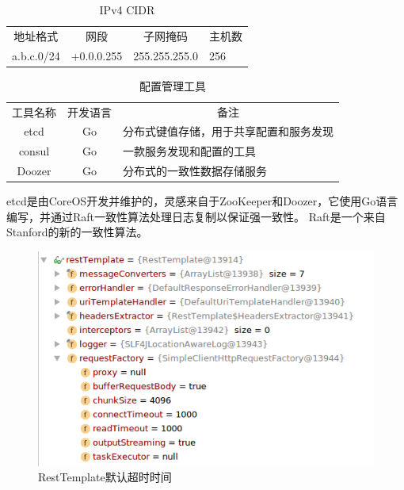 \documentclass[8pt]{book}
\numberwithin{dummy}{section}
\theoremstyle{ocrenumbox}
\theoremstyle{blacknumex}
\theoremstyle{blacknumbox}
\theoremstyle{ocrenum}
\begin{document}
\begin{table}[htbp]
	\caption{IPv4 CIDR}
	\label{table:ipv4cidr}
	\begin{center}
		\begin{tabular}{|c|c|c|p{3cm}|}
			\hline
			\multirow{1}{*}{地址格式}
			& \multicolumn{1}{c|}{网段}
			& \multicolumn{1}{c|}{子网掩码} 
			& \multicolumn{1}{c|}{主机数}\\			
			\cline{1-4}
			a.b.c.0/24 & +0.0.0.255 &  255.255.255.0  & 256 \\
			\hline							
		\end{tabular}	
	\end{center}
\end{table}



\begin{table}[htbp]
	\caption{配置管理工具}
	\label{table:configmanagementtool}
	\begin{center}
		\begin{tabular}{|c|c|p{8cm}|}
			\hline
			\multirow{1}{*}{工具名称}
			& \multicolumn{1}{c|}{开发语言} 
			& \multicolumn{1}{c|}{备注}\\			
			\cline{1-3}
			etcd &  Go  & 分布式键值存储，用于共享配置和服务发现 \\
			\hline
			consul & Go &  一款服务发现和配置的工具 \\
			\hline
			Doozer & Go & 分布式的一致性数据存储服务 \\
			\hline							
		\end{tabular}	
	\end{center}
\end{table}

etcd是由CoreOS开发并维护的，灵感来自于ZooKeeper和Doozer，它使用Go语言编写，并通过Raft一致性算法处理日志复制以保证强一致性。 Raft是一个来自Stanford的新的一致性算法。

\begin{figure}[htbp]
	\centering
	\includegraphics[scale=0.5]{resttempldatedefaulttimeout.png}
	\caption{RestTemplate默认超时时间}
	\label{fig:resttempldatedefaulttimeout}
\end{figure}
\end{document}
